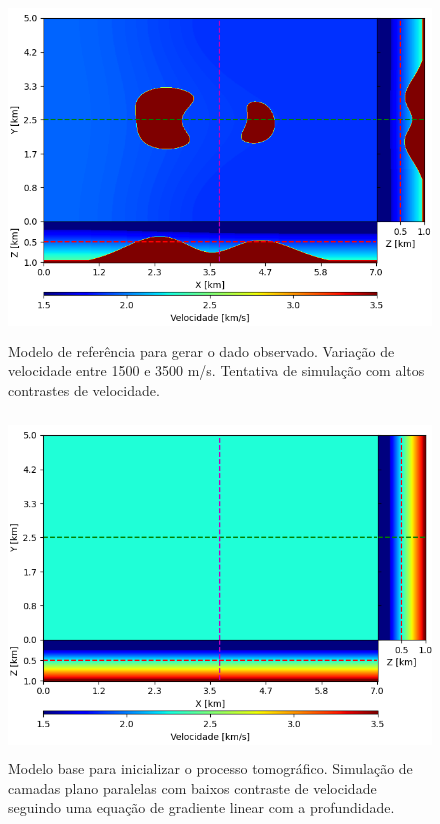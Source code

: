 \begin{figure}[H]
	\centering
	\includegraphics[width=12cm,height=9cm]{Imgs/Metodologia/true_model.png}
	\caption{Modelo de referência para gerar o dado observado. Variação de velocidade entre 1500 e 3500 m/s. Tentativa de simulação com altos contrastes de velocidade.}
	\label{fig:true_model}	
\end{figure}


\begin{figure}[H]
	\centering
	\includegraphics[width=12cm,height=9cm]{Imgs/Metodologia/init_model.png}
	\caption{Modelo base para inicializar o processo tomográfico. Simulação de camadas plano paralelas com baixos contraste de velocidade seguindo uma equação de gradiente linear com a profundidade.}
	\label{fig:init_model}	
\end{figure}




